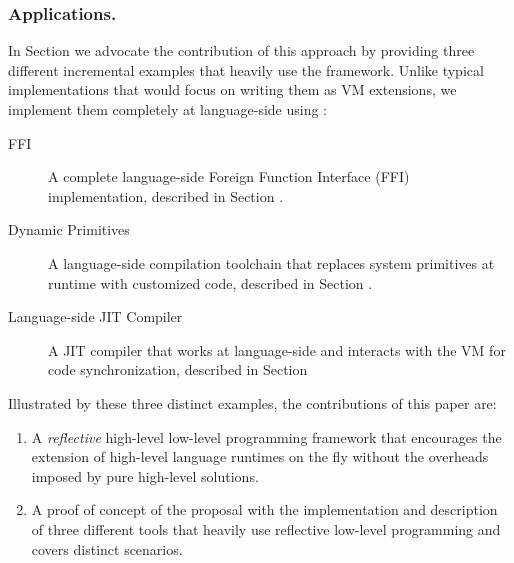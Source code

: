 \subsubsection{\B Applications.}
In Section  we advocate the contribution of this approach by providing three different incremental examples that heavily use the framework.
Unlike typical implementations that would focus on writing them as VM extensions, we implement them completely at language-side using \B:

\begin{description}
	\item[FFI] A complete language-side Foreign Function Interface (FFI) implementation, described in Section .
	\item[Dynamic Primitives] A language-side compilation toolchain that replaces system primitives at runtime with customized code, described in Section . 
	\item[Language-side JIT Compiler] A JIT compiler that works at language-side and interacts with the VM for code synchronization, described in Section 
\end{description}


\noindent Illustrated by these three distinct examples, the contributions of this paper are:
\begin{enumerate} 
	\item A \emph{reflective} high-level low-level programming framework that encourages the extension of high-level language runtimes on the fly without the overheads imposed by pure high-level solutions. 
	\item A proof of concept of the proposal with the implementation and description of three different tools that heavily use reflective low-level programming and covers distinct scenarios.
\end{enumerate}




